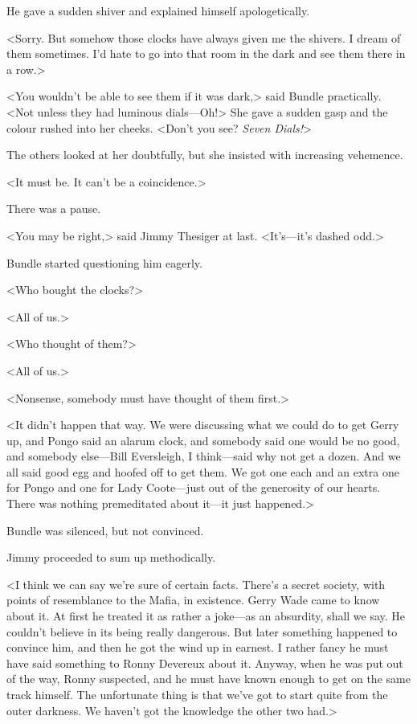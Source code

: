 He gave a sudden shiver and explained himself apologetically.

<Sorry. But somehow those clocks have always given me the shivers. I dream of them sometimes. I'd hate to go into that room in the dark and see them there in a row.>

<You wouldn't be able to see them if it was dark,> said Bundle practically. <Not unless they had luminous dials—Oh!> She gave a sudden gasp and the colour rushed into her cheeks. <Don't you see? \emph{Seven Dials!}>

The others looked at her doubtfully, but she insisted with increasing vehemence.

<It must be. It can't be a coincidence.>

There was a pause.

<You may be right,> said Jimmy Thesiger at last. <It's—it's dashed odd.>

Bundle started questioning him eagerly.

<Who bought the clocks?>

<All of us.>

<Who thought of them?>

<All of us.>

<Nonsense, somebody must have thought of them first.>

<It didn't happen that way. We were discussing what we could do to get Gerry up, and Pongo said an alarum clock, and somebody said one would be no good, and somebody else—Bill Eversleigh, I think—said why not get a dozen. And we all said good egg and hoofed off to get them. We got one each and an extra one for Pongo and one for Lady Coote—just out of the generosity of our hearts. There was nothing premeditated about it—it just happened.>

Bundle was silenced, but not convinced.

Jimmy proceeded to sum up methodically.

<I think we can say we're sure of certain facts. There's a secret society, with points of resemblance to the Mafia, in existence. Gerry Wade came to know about it. At first he treated it as rather a joke—as an absurdity, shall we say. He couldn't believe in its being really dangerous. But later something happened to convince him, and then he got the wind up in earnest. I rather fancy he must have said something to Ronny Devereux about it. Anyway, when he was put out of the way, Ronny suspected, and he must have known enough to get on the same track himself. The unfortunate thing is that we've got to start quite from the outer darkness. We haven't got the knowledge the other two had.>

